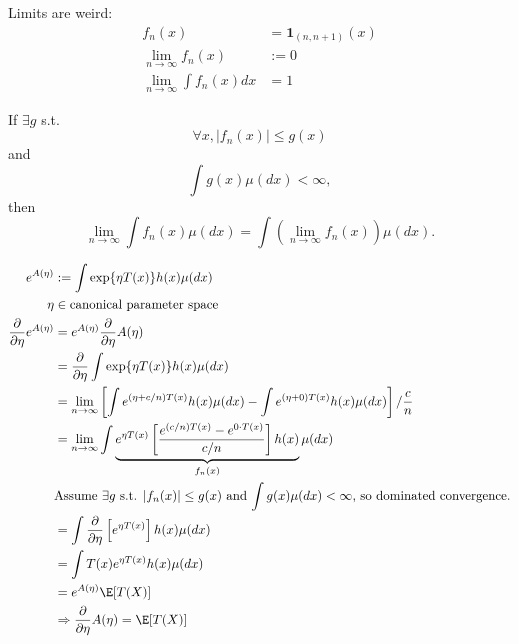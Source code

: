 \documentclass[twoside]{article}
\begin{document}
Limits are weird:
\begin{align*}
  f_n(x) &= \mathbf{1}_{(n, n+1)}(x) \\
  \lim_{n \rightarrow \infty} f_n(x) &:= 0 \\
  \lim_{n \rightarrow \infty} \int f_n(x) dx &= 1
\end{align*}

\begin{theorem}
  If $\exists g$ s.t. \[\forall x, |f_n(x)| \le g(x)\] and \[\int g(x) \mu(dx) <
  \infty,\] then \[\lim_{n \rightarrow \infty} \int f_n(x) \mu(dx) = \int
  \left(\lim_{n \rightarrow \infty} f_n(x) \right) \mu(dx).\]
\end{theorem}

\begin{example}
\begin{align*}
  e^{A(\eta)} &:= \int \exp\{\eta T(x) \} h(x) \mu(dx) \\
  \eta &\in \text{canonical parameter space} \\
  \frac{\partial}{\partial \eta} e^{A(\eta)} &= e^{A(\eta)}
  \frac{\partial}{\partial \eta}A(\eta) \\
  &= \frac{\partial}{\partial \eta} \int \exp\{\eta T(x) \} h(x) \mu(dx)\\
  &= \lim_{n \rightarrow \infty} \left[ \int e^{(\eta + c/n)T(x)} h(x) \mu(dx) -
  \int e^{(\eta + 0)T(x)} h(x) \mu(dx) \right]/ \frac{c}{n} \\
  &= \lim_{n \rightarrow \infty} \int \underbrace{e^{\eta T(x)} \left[
  \frac{e^{(c/n)T(x)} - e^{0 \cdot T(x)}}{c/n} \right] h(x)}_{f_n(x)} \mu(dx) \\
  & \text{Assume $\exists g$ s.t. $|f_n(x)| \le g(x)$ and $\int g(x) \mu(dx) <
  \infty$, so dominated convergence.} \\
  &= \int \frac{\partial}{\partial \eta} \left[e^{\eta T(x)}\right] h(x) \mu(dx) \\
  &= \int T(x) e^{\eta T(x)} h(x) \mu(dx)  \\
  &= e^{A(\eta)} \E[T(X)] \\
  &\Rightarrow \frac{\partial}{\partial \eta} A(\eta) = \E[T(X)]
\end{align*}
\end{example}




\end{document}
